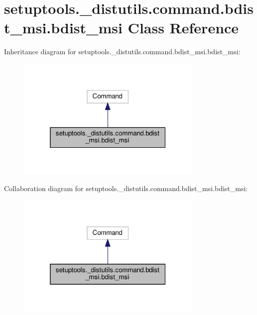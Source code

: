 \hypertarget{classsetuptools_1_1__distutils_1_1command_1_1bdist__msi_1_1bdist__msi}{}\section{setuptools.\+\_\+distutils.\+command.\+bdist\+\_\+msi.\+bdist\+\_\+msi Class Reference}
\label{classsetuptools_1_1__distutils_1_1command_1_1bdist__msi_1_1bdist__msi}


Inheritance diagram for setuptools.\+\_\+distutils.\+command.\+bdist\+\_\+msi.\+bdist\+\_\+msi\+:
\nopagebreak
\begin{figure}[H]
\begin{center}
\leavevmode
\includegraphics[width=253pt]{classsetuptools_1_1__distutils_1_1command_1_1bdist__msi_1_1bdist__msi__inherit__graph}
\end{center}
\end{figure}


Collaboration diagram for setuptools.\+\_\+distutils.\+command.\+bdist\+\_\+msi.\+bdist\+\_\+msi\+:
\nopagebreak
\begin{figure}[H]
\begin{center}
\leavevmode
\includegraphics[width=253pt]{classsetuptools_1_1__distutils_1_1command_1_1bdist__msi_1_1bdist__msi__coll__graph}
\end{center}
\end{figure}
